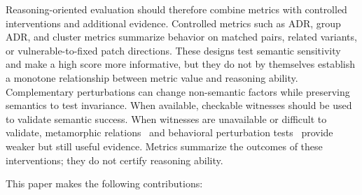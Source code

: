 \documentclass[acmsmall,screen,review,anonymous]{acmart}
\begin{document}
Reasoning-oriented evaluation should therefore combine metrics with
controlled interventions and additional evidence. Controlled metrics such as
ADR, group ADR, and cluster metrics summarize behavior on matched pairs,
related variants, or vulnerable-to-fixed patch directions. These designs test
semantic sensitivity and make a high score more informative, but they do not
by themselves establish a monotone relationship between metric value and
reasoning ability. Complementary perturbations can change non-semantic factors
while preserving semantics to test invariance. When available, checkable
witnesses should be used to validate semantic success. When witnesses are
unavailable or difficult to validate, metamorphic
relations~\cite{Chen2018MetamorphicSurvey} and behavioral perturbation
tests~\cite{Ribeiro2020CheckList} provide weaker but still useful evidence.
Metrics summarize the outcomes of these interventions; they do not certify
reasoning ability.

This paper makes the following contributions:
\end{document}
